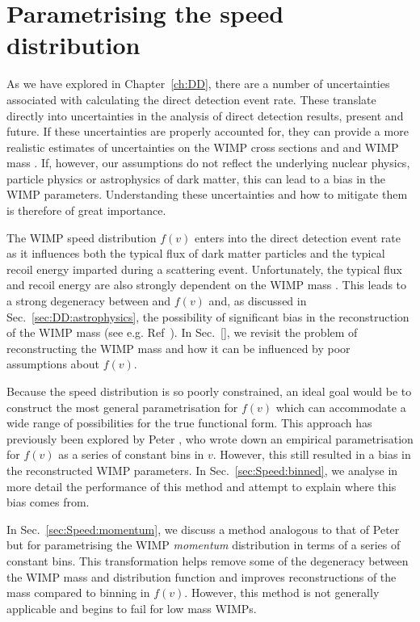 \chapter{Parametrising the speed distribution}
\label{ch:Speed}

As we have explored in Chapter~\ref{ch:DD}, there are a number of uncertainties associated with calculating the direct detection event rate. These translate directly into uncertainties in the analysis of direct detection results, present and future. If these uncertainties are properly accounted for, they can provide a more realistic estimates of uncertainties on the WIMP cross sections \sigmapsi and \sigmapsd and WIMP mass \mchi. If, however, our assumptions do not reflect the underlying nuclear physics, particle physics or astrophysics of dark matter, this can lead to a bias in the WIMP parameters. Understanding these uncertainties and how to mitigate them is therefore of great importance.

The WIMP speed distribution $f(v)$ enters into the direct detection event rate as it influences both the typical flux of dark matter particles and the typical recoil energy imparted during a scattering event. Unfortunately, the typical flux and recoil energy are also strongly dependent on the WIMP mass \mchi. This leads to a strong degeneracy between \mchi and $f(v)$ and, as discussed in Sec.~\ref{sec:DD:astrophysics}, the possibility of significant bias in the reconstruction of the WIMP mass (see e.g. Ref~\cite{Peter:2011}).  In Sec.~\ref{}, we revisit the problem of reconstructing the WIMP mass and how it can be influenced by poor assumptions about $f(v)$.

Because the speed distribution is so poorly constrained, an ideal goal would be to construct the most general parametrisation for $f(v)$ which can accommodate a wide range of possibilities for the true functional form. This approach has previously been explored by Peter \cite{Peter:2011}, who wrote down an empirical parametrisation for $f(v)$ as a series of constant bins in $v$. However, this still resulted in a bias in the reconstructed WIMP parameters. In Sec.~\ref{sec:Speed:binned}, we analyse in more detail the performance of this method and attempt to explain where this bias comes from.

In Sec.~\ref{sec:Speed:momentum}, we discuss a method analogous to that of Peter but for parametrising the WIMP \textit{momentum} distribution in terms of a series of constant bins. This transformation helps remove some of the degeneracy between the WIMP mass and distribution function and improves reconstructions of the mass compared to binning in $f(v)$. However, this method is not generally applicable and begins to fail for low mass WIMPs. 


